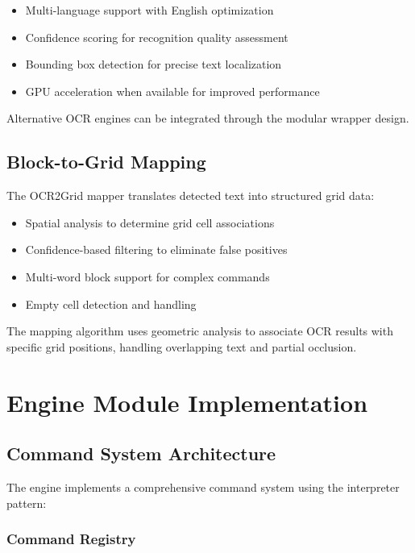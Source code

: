 \begin{itemize}
    \item Multi-language support with English optimization
    \item Confidence scoring for recognition quality assessment
    \item Bounding box detection for precise text localization
    \item GPU acceleration when available for improved performance
\end{itemize}

Alternative OCR engines can be integrated through the modular wrapper design.

\subsection{Block-to-Grid Mapping}

The OCR2Grid mapper translates detected text into structured grid data:

\begin{itemize}
    \item Spatial analysis to determine grid cell associations
    \item Confidence-based filtering to eliminate false positives
    \item Multi-word block support for complex commands
    \item Empty cell detection and handling
\end{itemize}

The mapping algorithm uses geometric analysis to associate OCR results with specific grid positions, handling overlapping text and partial occlusion.

\section{Engine Module Implementation}

\subsection{Command System Architecture}

The engine implements a comprehensive command system using the interpreter pattern:

\subsubsection{Command Registry}

